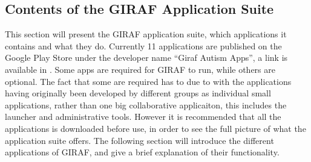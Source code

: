 \subsection{Contents of the GIRAF Application Suite}
This section will present the GIRAF application suite, which applications it contains and what they do.
Currently 11 applications are published on the Google Play Store under the developer name ``Giraf Autism Apps'', a link is available in \cite{GIRAFGOOGLEPLAY}.
Some apps are required for GIRAF to run, while others are optional.
The fact that some are required has to due to with the applications having originally been developed by different groups as individual small applications, rather than one big collaborative applicaiton, this includes the launcher and administrative tools.
However it is recommended that all the applications is downloaded before use, in order to see the full picture of what the application suite offers.
The following section will introduce the different applications of GIRAF, and give a brief explanation of their functionality.
